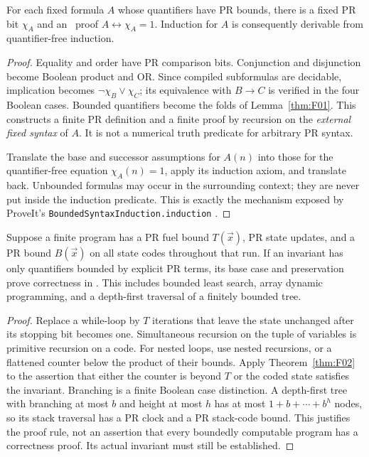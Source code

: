 \begin{theorem}\label{thm:F02}
For each fixed formula $A$ whose quantifiers have PR bounds, there is a fixed PR bit $\chi_A$ and an \ipra\ proof $A\leftrightarrow\chi_A=1$. Induction for $A$ is consequently derivable from quantifier-free induction.
\end{theorem}
\begin{proof}
Equality and order have PR comparison bits. Conjunction and disjunction become Boolean product and OR. Since compiled subformulas are decidable, implication becomes $\neg\chi_B\lor\chi_C$; its equivalence with $B\to C$ is verified in the four Boolean cases. Bounded quantifiers become the folds of Lemma~\ref{thm:F01}. This constructs a finite PR definition and a finite proof by recursion on the \emph{external fixed syntax} of $A$. It is not a numerical truth predicate for arbitrary PR syntax.

Translate the base and successor assumptions for $A(n)$ into those for the quantifier-free equation $\chi_A(n)=1$, apply its induction axiom, and translate back. Unbounded formulas may occur in the surrounding context; they are never put inside the induction predicate. This is exactly the mechanism exposed by ProveIt's \texttt{BoundedSyntaxInduction.induction} \cite{ProveItBounded}.
\end{proof}

\begin{lemma}\label{thm:F03}
Suppose a finite program has a PR fuel bound $T(\vec x)$, PR state updates, and a PR bound $B(\vec x)$ on all state codes throughout that run. If an invariant has only quantifiers bounded by explicit PR terms, its base case and preservation prove correctness in \ipra. This includes bounded least search, array dynamic programming, and a depth-first traversal of a finitely bounded tree.
\end{lemma}
\begin{proof}
Replace a while-loop by $T$ iterations that leave the state unchanged after its stopping bit becomes one. Simultaneous recursion on the tuple of variables is primitive recursion on a code. For nested loops, use nested recursions, or a flattened counter below the product of their bounds. Apply Theorem~\ref{thm:F02} to the assertion that either the counter is beyond $T$ or the coded state satisfies the invariant. Branching is a finite Boolean case distinction. A depth-first tree with branching at most $b$ and height at most $h$ has at most $1+b+\cdots+b^h$ nodes, so its stack traversal has a PR clock and a PR stack-code bound. This justifies the proof rule, not an assertion that every boundedly computable program has a correctness proof. Its actual invariant must still be established.
\end{proof}

